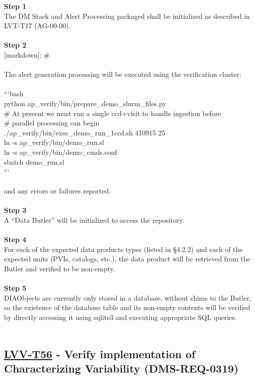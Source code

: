 \textbf{Step 1}\\
The DM Stack and Alert Processing packaged shall be initialized as
described in LVT-T17 (AG-00-00).\\
~\\
\textbf{Step 2}\\
{[}markdown{]}: \#\\
~\\
The alert generation processing will be executed using the verification
cluster:\\
~\\
```bash\\
python ap\_verify/bin/prepare\_demo\_slurm\_files.py\\
\# At present we must run a single ccd+visit to handle ingestion
before\\
\# parallel processing can begin\\
./ap\_verify/bin/exec\_demo\_run\_1ccd.sh 410915 25\\
ln -s ap\_verify/bin/demo\_run.sl\\
ln -s ap\_verify/bin/demo\_cmds.conf\\
sbatch demo\_run.sl\\
```\\
~\\
and any errors or failures reported.\\
~\\
\textbf{Step 3}\\
A ``Data Butler'' will be initialized to access the repository.\\
~\\
\textbf{Step 4}\\
For each of the expected data products types (listed in §4.2.2) and each
of the expected units (PVIs, catalogs, etc.), the data product will be
retrieved from the Butler and verified to be non-empty.\\
~\\
\textbf{Step 5}\\
DIAObjects are currently only stored in a database, without shims to the
Butler, so the existence of the database table and its non-empty
contents will be verified by directly accessing it using sqlite3 and
executing appropriate SQL queries.\\
~\\

\hypertarget{lvv-t56---verify-implementation-of-characterizing-variability-dms-req-0319}{%
\subsection{\texorpdfstring{\href{https://jira.lsstcorp.org/secure/Tests.jspa\#/testCase/LVV-T56}{LVV-T56}
- Verify implementation of Characterizing Variability
(DMS-REQ-0319)}{LVV-T56 - Verify implementation of Characterizing Variability (DMS-REQ-0319)}}\label{lvv-t56---verify-implementation-of-characterizing-variability-dms-req-0319}}


